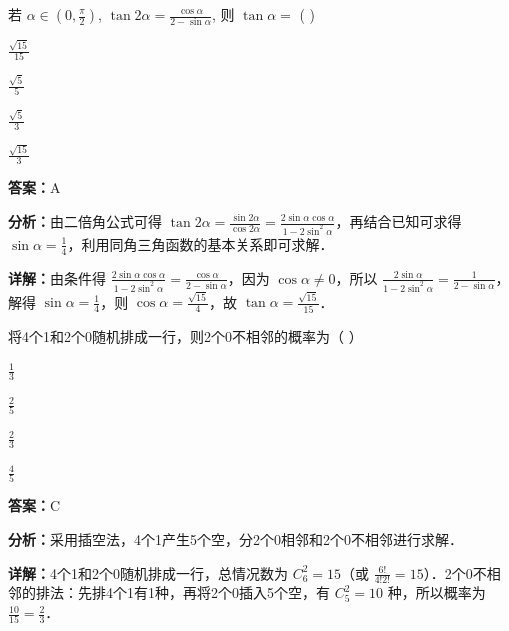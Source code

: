 \begin{question}[points=5]
若 $\alpha \in \left(0, \frac{\pi}{2}\right)$, $\tan 2\alpha = \frac{\cos \alpha}{2 - \sin \alpha}$, 则 $\tan \alpha = $ ( )
\begin{choices}
  \item $\frac{\sqrt{15}}{15}$
  \item $\frac{\sqrt{5}}{5}$
  \item $\frac{\sqrt{5}}{3}$
  \item $\frac{\sqrt{15}}{3}$
\end{choices}
\begin{solution}
\textbf{答案：}A

\textbf{分析：}由二倍角公式可得 $\tan 2\alpha = \frac{\sin 2\alpha}{\cos 2\alpha} = \frac{2\sin \alpha \cos \alpha}{1-2\sin^2 \alpha}$，再结合已知可求得 $\sin \alpha = \frac{1}{4}$，利用同角三角函数的基本关系即可求解．

\textbf{详解：}由条件得 $\frac{2\sin \alpha \cos \alpha}{1-2\sin^2 \alpha} = \frac{\cos \alpha}{2-\sin \alpha}$，因为 $\cos \alpha \neq 0$，所以 $\frac{2\sin \alpha}{1-2\sin^2 \alpha} = \frac{1}{2-\sin \alpha}$，解得 $\sin \alpha = \frac{1}{4}$，则 $\cos \alpha = \frac{\sqrt{15}}{4}$，故 $\tan \alpha = \frac{\sqrt{15}}{15}$．
\end{solution}
\end{question}

\begin{question}[points=5]
将4个1和2个0随机排成一行，则2个0不相邻的概率为（ ）
\begin{choices}
  \item $\frac{1}{3}$
  \item $\frac{2}{5}$
  \item $\frac{2}{3}$
  \item $\frac{4}{5}$
\end{choices}
\begin{solution}
\textbf{答案：}C

\textbf{分析：}采用插空法，4个1产生5个空，分2个0相邻和2个0不相邻进行求解．

\textbf{详解：}4个1和2个0随机排成一行，总情况数为 $C_6^2 = 15$（或 $\frac{6!}{4!2!} = 15$）．2个0不相邻的排法：先排4个1有1种，再将2个0插入5个空，有 $C_5^2 = 10$ 种，所以概率为 $\frac{10}{15} = \frac{2}{3}$．
\end{solution}
\end{question}

